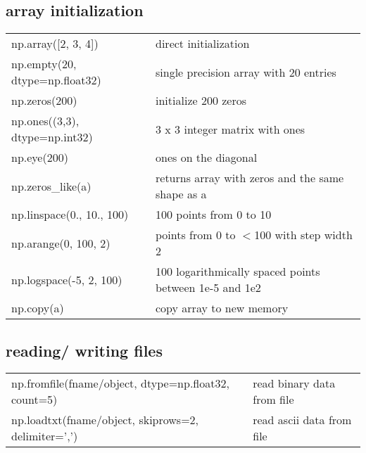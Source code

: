 \documentclass[10pt, a4paper, twocolumn]{article}
\begin{document}
\subsection*{array initialization}
\begin{tabular}{ p{} p{} }
 np.array([2, 3, 4]) & direct initialization\\
np.empty(20, dtype=np.float32) & single precision array with 20 entries\\
       np.zeros(200) & initialize 200 zeros\\
     np.ones((3,3), dtype=np.int32) & 3 x 3 integer matrix with ones\\
                        np.eye(200) & ones on the diagonal\\
                  np.zeros\_like(a) & returns array with zeros and the same shape as a\\
 np.linspace(0., 10., 100) & 100 points from 0 to 10\\
 np.arange(0, 100, 2) & points from 0 to $<$100 with step width 2\\
 np.logspace(-5, 2, 100) & 100 logarithmically spaced points between 1e-5 and 1e2\\
 np.copy(a) & copy array to new memory\\
\end{tabular}

\subsection*{reading/ writing files}
\begin{tabular}{ p{} p{} }
 np.fromfile(fname/object, dtype=np.float32, count=5) & read binary data from file\\
 np.loadtxt(fname/object, skiprows=2, delimiter=',') & read ascii data from file
\end{tabular}
\end{document}
